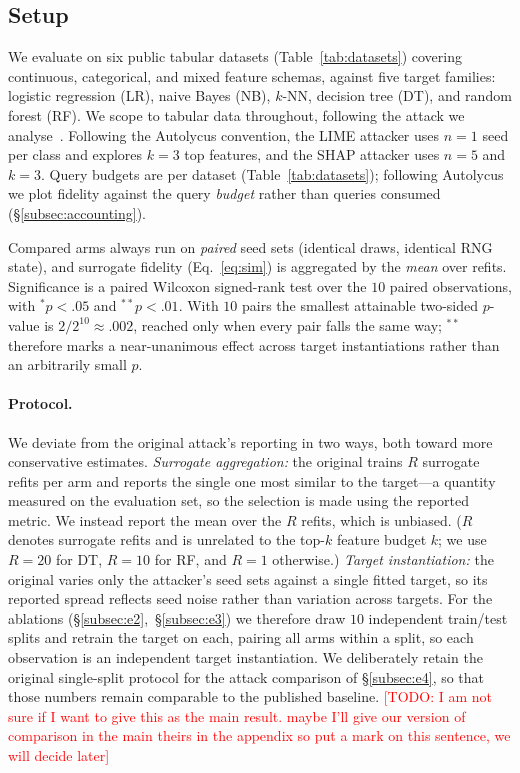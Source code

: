 \documentclass[sigconf,anonymous,review]{acmart}
\newcommand{\TODO}[1]{\textcolor{red}{[TODO: #1]}}
\begin{document}
\subsection{Setup}
\label{subsec:setup}
We evaluate on six public tabular datasets (Table~\ref{tab:datasets}) covering continuous,
categorical, and mixed feature schemas, against five target families: logistic regression (LR), naive
Bayes (NB), $k$-NN, decision tree (DT), and random forest (RF). We scope to tabular data throughout,
following the attack we analyse~\cite{oksuz2024autolycus}. Following the Autolycus convention, the
LIME attacker uses $n{=}1$
seed per class and explores $k{=}3$ top features, and the SHAP attacker uses $n{=}5$ and $k{=}3$.
Query budgets are per dataset (Table~\ref{tab:datasets}); following Autolycus we plot fidelity
against the query \emph{budget} rather than queries consumed (\S\ref{subsec:accounting}).

Compared arms always run on \emph{paired} seed sets (identical draws, identical RNG state), and
surrogate fidelity (Eq.~\ref{eq:sim}) is aggregated by the \emph{mean} over refits. Significance is a
paired Wilcoxon signed-rank test over the $10$ paired observations, with $^{*}p{<}.05$ and
$^{**}p{<}.01$. With $10$ pairs the smallest attainable two-sided $p$-value is $2/2^{10}\approx.002$,
reached only when every pair falls the same way; $^{**}$ therefore marks a near-unanimous effect across
target instantiations rather than an arbitrarily small $p$.

\paragraph{Protocol.} We deviate from the original attack's reporting in two ways, both toward more
conservative estimates. \emph{Surrogate aggregation:} the original trains $R$ surrogate refits per
arm and reports the single one most similar to the target---a quantity measured on the evaluation set,
so the selection is made using the reported metric. We instead report the mean over the $R$ refits,
which is unbiased. ($R$ denotes surrogate refits and is unrelated to the top-$k$ feature budget $k$;
we use $R{=}20$ for DT, $R{=}10$ for RF, and $R{=}1$ otherwise.)
\emph{Target instantiation:} the original varies only the attacker's seed sets against a single fitted
target, so its reported spread reflects seed noise rather than variation across targets. For the
ablations (\S\ref{subsec:e2},~\S\ref{subsec:e3}) we therefore draw $10$ independent train/test splits
and retrain the target on each, pairing all arms within a split, so each observation is an independent
target instantiation. 
We deliberately retain the original single-split protocol for the attack
comparison of \S\ref{subsec:e4}, so that those numbers remain comparable to the published baseline. \TODO{I am not sure if I want to give this as the main result. maybe I'll give our version of comparison in the main theirs in the appendix so put a mark on this sentence, we will decide later}
\end{document}
